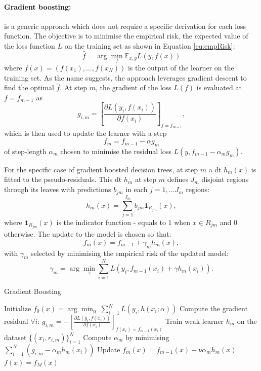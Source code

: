 \paragraph{Gradient boosting:} is a generic approach which does not require a specific derivation for each loss function. The objective is to minimise the empirical risk, the expected value of the loss function $L$ on the training set as shown in Equation \ref{eq:empRisk}: 
\begin{equation}\label{eq:empRisk}
    \hat{f}  = \arg \min_f \mathbb{E}_{x,y} L(y, f(x))
\end{equation}
where $f(x) = (f(x_1), ..., f(x_N))$ is the output of the learner on the training set. As the name suggests, the approach leverages gradient descent to find the optimal $\hat{f}$. At step $m$, the gradient of the loss $L(f)$ is evaluated at $f = f_{m-1}$ as \[ g_{i,m} = \left[ \frac{\partial  L(y_i, f(x_i))}{\partial f(x_i)} \right]_{f= f_{m-1}}, \] which is then used to update the learner with a step \[ f_m = f_{m-1} - \alpha g_{m}\] of step-length $\alpha_m$ chosen to minimise the residual loss $L(y, f_{m-1} - \alpha_m g_{m})$. 

For the specific case of gradient boosted decision trees, at step $m$ a \gls{dt} $h_m(x)$ is fitted to the pseudo-residuals. This \gls{dt} $h_m$ at step $m$ defines $J_m$ disjoint regions through its leaves with predictions $b_{jm}$ in each $j = 1, ... J_m$ regions: \[ h_m(x) = \sum_{j=1}^{J_m} b_{jm} \textbf{1}_{R_{jm}}(x),\] where $\textbf{1}_{R_{jm}}(x)$ is the indicator function - equals to 1 when $x \in R_{jm}$ and 0 otherwise. The update to the model is chosen so that: \[f_m(x) = f_{m-1} + \gamma_m h_m(x),\] with $\gamma_m$ selected by minimising the empirical risk of the updated model: \[ \gamma_m = \arg \min_{\gamma} \sum_{i=1}^N L(y_i, f_{m-1}(x_i) + \gamma h_m(x_i)).\]

\begin{algorithm}
    \caption{Gradient Boosting \cite{MurphyML}}
    \label{algo:gradient_boosting}
    \begin{algorithmic}
    \State Initialize $f_0(x) = \arg\min_\alpha \,\sum_{i=1}^N L(y_i, h(x_i; \alpha))$
        \State Compute the gradient residual $\forall i$: $g_{i,m} = -\left[\frac{\partial L(y_i, f(x_i))}{\partial f(x_i)}\right]_{f(x_i) = f_{m-1}(x_i)}$
        \State Train weak learner $h_m$ on the dataset $\{(x_i, r_{i,m})\}_{i=1}^N$
        \State Compute $\alpha_m$ by minimising $\sum_{i=1}^N(g_{i,m} - \alpha_m h_m(x_i))$
        \State Update $f_m(x) = f_{m-1}(x) + \nu \alpha_m h_m(x)$
    \EndFor
    \State \Return $f(x) = f_M(x)$
    \end{algorithmic}
\end{algorithm}

